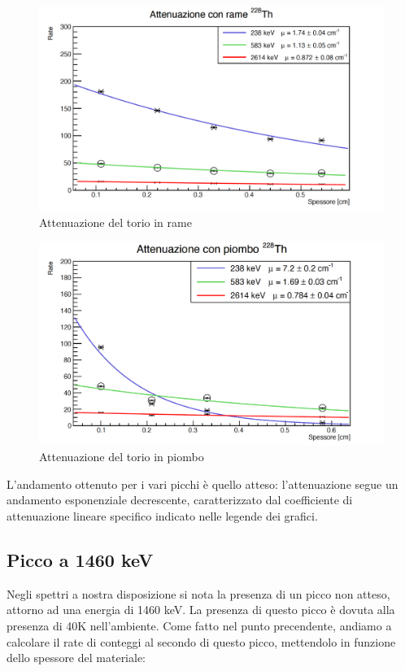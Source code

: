 \documentclass[a4paper,10pt]{article}
\begin{document}
\begin{figure}[H]
    \centering
    \includegraphics[scale=0.6]{grafici/attenuazionetoriorame}
    \caption{Attenuazione del torio in rame}
\end{figure}

\begin{figure}[H]
    \centering
    \includegraphics[scale=0.6]{grafici/attenuazionetoriopiombo}
    \caption{Attenuazione del torio in piombo}
\end{figure}

\noindent L'andamento ottenuto per i vari picchi \`e quello atteso: l'attenuazione segue un andamento esponenziale decrescente, caratterizzato dal coefficiente di attenuazione lineare specifico indicato nelle legende dei grafici.

\subsection{Picco a 1460 keV}

\noindent Negli spettri a nostra disposizione si nota la presenza di un picco non atteso, attorno ad una energia di 1460 keV. La presenza di questo picco \`e dovuta alla presenza di 40K nell'ambiente. Come fatto nel punto precendente, andiamo a calcolare il rate di conteggi al secondo di questo picco, mettendolo in funzione dello spessore del materiale:
\end{document}

